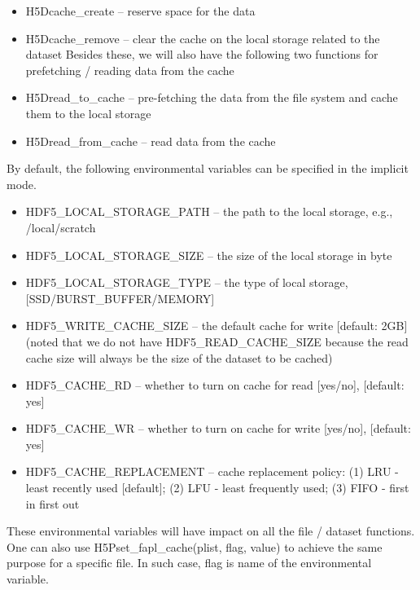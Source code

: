 \documentclass[aps, rmp, 11pt, notitlepage]{revtex4-1}
\begin{document}
\begin{itemize}
\begin{itemize}
\item H5Dcache\_create -- reserve space for the data
\item H5Dcache\_remove -- clear the cache on the local storage related to the dataset Besides these, we will also have the following two functions for prefetching / reading data from the cache
\item H5Dread\_to\_cache -- pre-fetching the data from the file system and cache them to the local storage
\item H5Dread\_from\_cache -- read data from the cache
\end{itemize}
\end{itemize}

By default, the following environmental variables can be specified in the implicit mode. 
\begin{itemize}
\item HDF5\_LOCAL\_STORAGE\_PATH -- the path to the local storage, e.g., /local/scratch
\item HDF5\_LOCAL\_STORAGE\_SIZE -- the size of the local storage in byte
\item HDF5\_LOCAL\_STORAGE\_TYPE -- the type of local storage, [SSD/BURST\_BUFFER/MEMORY]
\item HDF5\_WRITE\_CACHE\_SIZE -- the default cache for write [default: 2GB] (noted that we do not have HDF5\_READ\_CACHE\_SIZE because the read cache size will always be the size of the dataset to be cached)
\item HDF5\_CACHE\_RD -- whether to turn on cache for read [yes/no], [default: yes]
\item HDF5\_CACHE\_WR -- whether to turn on cache for write [yes/no], [default: yes]
\item HDF5\_CACHE\_REPLACEMENT -- cache replacement policy: (1) LRU - least recently used [default]; (2) LFU - least frequently used; (3) FIFO - first in first out
\end{itemize}
These environmental variables will have impact on all the file / dataset functions. One can also use H5Pset\_fapl\_cache(plist, flag, value) to achieve the same purpose for a specific file. In such case, flag is name of the environmental variable. 
\end{document}
